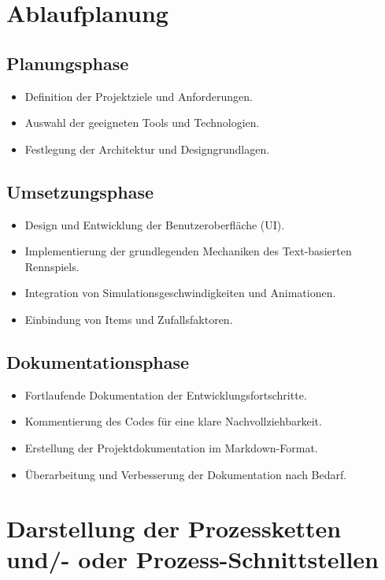 \documentclass{article}
\begin{document}
\section{Ablaufplanung}

\subsection{Planungsphase}

\begin{itemize}
    \item Definition der Projektziele und Anforderungen.
    \item Auswahl der geeigneten Tools und Technologien.
    \item Festlegung der Architektur und Designgrundlagen.
\end{itemize}

\subsection{Umsetzungsphase}

\begin{itemize}
    \item Design und Entwicklung der Benutzeroberfläche (UI).
    \item Implementierung der grundlegenden Mechaniken des Text-basierten Rennspiels.
    \item Integration von Simulationsgeschwindigkeiten und Animationen.
    \item Einbindung von Items und Zufallsfaktoren.
\end{itemize}

\subsection{Dokumentationsphase}

\begin{itemize}
    \item Fortlaufende Dokumentation der Entwicklungsfortschritte.
    \item Kommentierung des Codes für eine klare Nachvollziehbarkeit.
    \item Erstellung der Projektdokumentation im Markdown-Format.
    \item Überarbeitung und Verbesserung der Dokumentation nach Bedarf.
\end{itemize}

\section{Darstellung der Prozessketten und/- oder Prozess-Schnittstellen}
\end{document}
